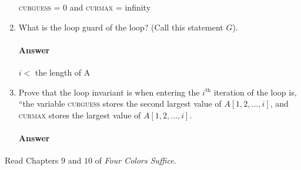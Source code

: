 \documentclass{article}
\begin{document}
\begin{enumerate}
        \textsc{curguess} = 0 and \textsc{curmax} = infinity

    \item What is the loop guard of the loop? (Call this statement $G$).

        \paragraph{Answer}

        $i \less$ the length of A

    \item Prove that the loop invariant is when entering the $i^\text{th}$
        iteration of the loop is, ``the variable \textsc{curguess} stores
        the second
        largest value of $A[1,2, \ldots, i]$,
        and \textsc{curmax} stores the largest value of $A[1,2,\ldots, i]$.

        \paragraph{Answer}


\end{enumerate}



\collab{\todo{}} 

Read Chapters $9$ and $10$ of \emph{Four Colors Suffice}.
\end{document}
